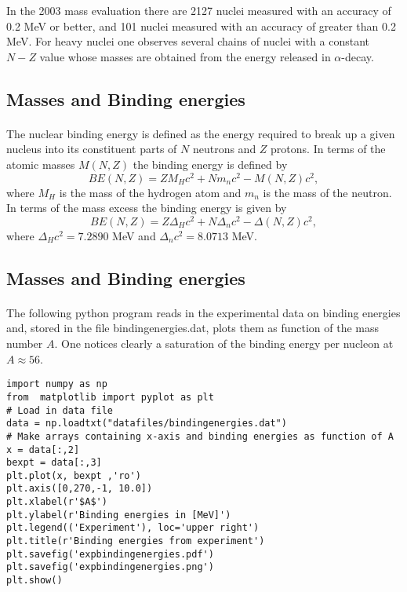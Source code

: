 \documentclass[%
twoside,                 %
final,                   %
10pt]{article}
\begin{document}
In the 2003 mass evaluation there are 2127 nuclei measured with an accuracy of 0.2
MeV or better, and 101 nuclei measured with an accuracy of greater than 0.2 MeV. For
heavy nuclei one observes several chains of nuclei with a constant $N-Z$ value whose masses are obtained from the energy released in $\alpha$-decay.




\subsection*{Masses and Binding energies}

\paragraph{}
The nuclear binding energy is defined as the energy required to break up a given nucleus
into its constituent parts of $N$ neutrons and $Z$ protons. In terms of the atomic masses $M(N, Z)$ the binding energy is defined by
\[
BE(N, Z) = ZM_H c^2 + Nm_n c^2 - M(N, Z)c^2 ,
\]
where $M_H$ is the mass of the hydrogen atom and $m_n$ is the mass of the neutron.
In terms of the mass excess the binding energy is given by
\[
BE(N, Z) = Z\Delta_H c^2 + N\Delta_n c^2 -\Delta(N, Z)c^2 ,
\]
where $\Delta_H c^2 = 7.2890$ MeV and $\Delta_n c^2 = 8.0713$ MeV.



\subsection*{Masses and Binding energies}

\paragraph{}
The following python program reads in the experimental data on binding energies and, stored in the file bindingenergies.dat,  plots them as function of the mass number $A$. One notices clearly a saturation of the binding energy per nucleon at $A\approx 56$.
\begin{verbatim}
import numpy as np
from  matplotlib import pyplot as plt
# Load in data file
data = np.loadtxt("datafiles/bindingenergies.dat")
# Make arrays containing x-axis and binding energies as function of A
x = data[:,2]
bexpt = data[:,3]
plt.plot(x, bexpt ,'ro')
plt.axis([0,270,-1, 10.0])
plt.xlabel(r'$A$')
plt.ylabel(r'Binding energies in [MeV]')
plt.legend(('Experiment'), loc='upper right')
plt.title(r'Binding energies from experiment')
plt.savefig('expbindingenergies.pdf')
plt.savefig('expbindingenergies.png')
plt.show()
\end{verbatim}
\end{document}
